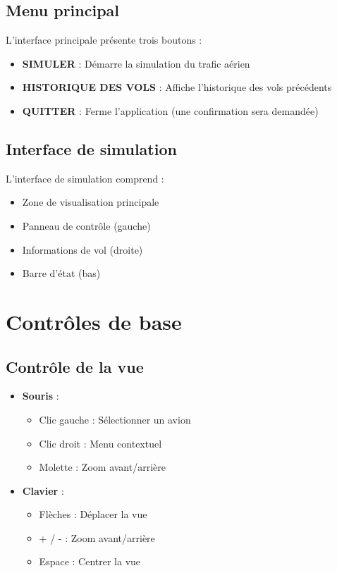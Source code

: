 \documentclass[12pt,a4paper]{article}
\begin{document}
\subsection{Menu principal}
L'interface principale présente trois boutons :
\begin{itemize}
    \item \textbf{SIMULER} : Démarre la simulation du trafic aérien
    \item \textbf{HISTORIQUE DES VOLS} : Affiche l'historique des vols précédents
    \item \textbf{QUITTER} : Ferme l'application (une confirmation sera demandée)
\end{itemize}

\subsection{Interface de simulation}
L'interface de simulation comprend :
\begin{itemize}
    \item Zone de visualisation principale
    \item Panneau de contrôle (gauche)
    \item Informations de vol (droite)
    \item Barre d'état (bas)
\end{itemize}

\section{Contrôles de base}

\subsection{Contrôle de la vue}
\begin{itemize}
    \item \textbf{Souris} : 
    \begin{itemize}
        \item Clic gauche : Sélectionner un avion
        \item Clic droit : Menu contextuel
        \item Molette : Zoom avant/arrière
    \end{itemize}
    \item \textbf{Clavier} :
    \begin{itemize}
        \item Flèches : Déplacer la vue
        \item + / - : Zoom avant/arrière
        \item Espace : Centrer la vue
    \end{itemize}
\end{itemize}
\end{document}
